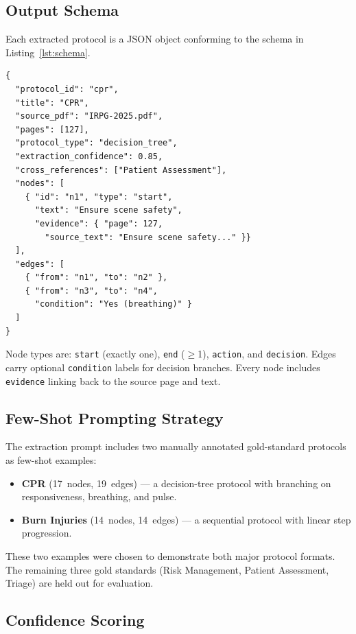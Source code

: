 \documentclass[12pt,a4paper]{article}
\begin{document}
\subsection{Output Schema}

Each extracted protocol is a JSON object conforming to the schema in Listing~\ref{lst:schema}.

\begin{lstlisting}[caption={Protocol graph schema (simplified).}, label={lst:schema}, language={}]
{
  "protocol_id": "cpr",
  "title": "CPR",
  "source_pdf": "IRPG-2025.pdf",
  "pages": [127],
  "protocol_type": "decision_tree",
  "extraction_confidence": 0.85,
  "cross_references": ["Patient Assessment"],
  "nodes": [
    { "id": "n1", "type": "start",
      "text": "Ensure scene safety",
      "evidence": { "page": 127,
        "source_text": "Ensure scene safety..." }}
  ],
  "edges": [
    { "from": "n1", "to": "n2" },
    { "from": "n3", "to": "n4",
      "condition": "Yes (breathing)" }
  ]
}
\end{lstlisting}

Node types are: \texttt{start} (exactly one), \texttt{end} ($\geq$1), \texttt{action}, and \texttt{decision}. Edges carry optional \texttt{condition} labels for decision branches. Every node includes \texttt{evidence} linking back to the source page and text.

\subsection{Few-Shot Prompting Strategy}

The extraction prompt includes two manually annotated gold-standard protocols as few-shot examples:
\begin{itemize}[leftmargin=2em]
    \item \textbf{CPR} (17~nodes, 19~edges) --- a decision-tree protocol with branching on responsiveness, breathing, and pulse.
    \item \textbf{Burn Injuries} (14~nodes, 14~edges) --- a sequential protocol with linear step progression.
\end{itemize}

These two examples were chosen to demonstrate both major protocol formats. The remaining three gold standards (Risk Management, Patient Assessment, Triage) are held out for evaluation.

\subsection{Confidence Scoring}
\end{document}
